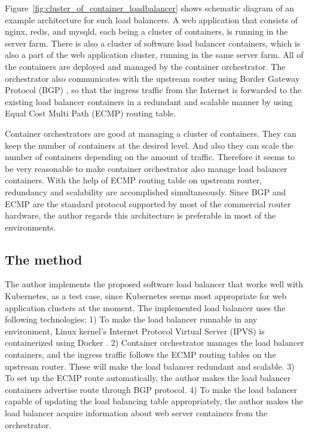 Figure~\ref{fig:cluster_of_container_loadbalancer} shows schematic diagram of an example architecture for such load balancers.
A web application that consists of nginx, redis, and mysqld, each being a cluster of containers, is running in the server farm.
There is also a cluster of software load balancer containers, which is also a part of the web application cluster, running in the same server farm. 
All of the containers are deployed and managed by the container orchestrator.
The orchestrator also communicates with the upstream router using Border Gateway Protocol (BGP) \cite{rfc7911}, so that the ingress traffic from the Internet is forwarded to the existing load balancer containers in a redundant and scalable manner by using Equal Cost Multi Path (ECMP) \cite{al2008scalable} routing table.


  Container orchestrators are good at managing a cluster of containers.
  They can keep the number of containers at the desired level.
  And also they can scale the number of containers depending on the amount of traffic.
  Therefore it seems to be very reasonable to make container orchestrator also manage load balancer containers.
  With the help of ECMP routing table on upstream router, redundancy and scalability are accomplished simultaneously.
  Since BGP and ECMP are the standard protocol supported by most of the commercial router hardware, the author regards this architecture is preferable in most of the environments.



\subsection{The method}




  The author implements the proposed software load balancer that works well with Kubernetes, as a test case, since Kubernetes seems most appropriate for web application clusters at the moment.
  The implemented load balancer uses the following technologies;
  1) To make the load balancer runnable in any environment, Linux kernel's Internet Protocol Virtual Server (IPVS) \cite{Zhang2000} is containerized using Docker \cite{merkel2014docker}.
  2) Container orchestrator manages the load balancer containers, and the ingress traffic follows the  ECMP routing tables on the upstream router. These will make the load balancer redundant and scalable.
  3) To set up the ECMP route automatically, the author makes the load balancer containers advertise route through BGP protocol.
  4) To make the load balancer capable of updating the load balancing table appropriately, the author makes the load balancer acquire information about web server containers from the orchestrator.




